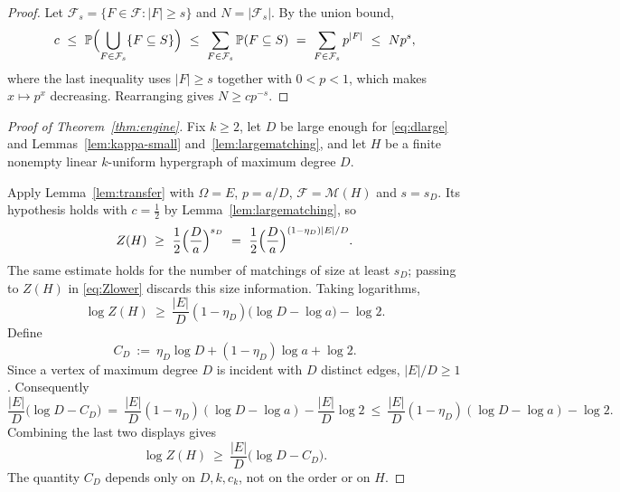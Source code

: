 \documentclass[10pt,a4paper]{amsart}
\newcommand{\EE}{E}
\newcommand{\Mat}{\mathcal{M}}
\newcommand{\PP}{\mathbb{P}}
\begin{document}
\begin{proof}
Let $\mathcal{F}_s=\{F\in\mathcal{F}:|F|\ge s\}$ and $N=|\mathcal{F}_s|$. By the union
bound,
\[
  c\ \le\ \PP\Bigl(\bigcup_{F\in\mathcal{F}_s}\{F\subseteq S\}\Bigr)
  \ \le\ \sum_{F\in\mathcal{F}_s}\PP(F\subseteq S)
  \ =\ \sum_{F\in\mathcal{F}_s}p^{|F|}
  \ \le\ N p^{s},
\]
where the last inequality uses $|F|\ge s$ together with $0<p<1$, which makes
$x\mapsto p^{x}$ decreasing. Rearranging gives $N\ge cp^{-s}$.
\end{proof}

\begin{proof}[Proof of Theorem~\ref{thm:engine}]
Fix $k\ge2$, let $D$ be large enough for \eqref{eq:dlarge} and
Lemmas~\ref{lem:kappa-small} and~\ref{lem:largematching}, and let $H$ be a finite
nonempty linear $k$-uniform hypergraph of maximum degree $D$.

Apply Lemma~\ref{lem:transfer} with $\Omega=\EE$, $p=a/D$, $\mathcal{F}=\Mat(H)$ and
$s=s_D$. Its hypothesis holds with $c=\tfrac12$ by Lemma~\ref{lem:largematching}, so
\begin{equation}
\label{eq:Zlower}
  Z(H)\ \ge\ \frac12\Bigl(\frac{D}{a}\Bigr)^{s_D}
  \ =\ \frac12\Bigl(\frac{D}{a}\Bigr)^{(1-\eta_D)|\EE|/D}.
\end{equation}
The same estimate holds for the number of matchings of size at least $s_D$;
passing to $Z(H)$ in \eqref{eq:Zlower} discards this size information.
Taking logarithms,
\[
  \log Z(H)\ \ge\ \frac{|\EE|}{D}(1-\eta_D)\bigl(\log D-\log a\bigr)-\log 2 .
\]
Define
\begin{equation}
\label{eq:Cd}
  C_D\ :=\ \eta_D\log D+(1-\eta_D)\log a+\log 2 .
\end{equation}
Since a vertex of maximum degree $D$ is incident with $D$ distinct edges,
$|\EE|/D\ge1$. Consequently
\[
  \frac{|\EE|}{D}\bigl(\log D-C_D\bigr)
  \ =\ \frac{|\EE|}{D}(1-\eta_D)(\log D-\log a)
       -\frac{|\EE|}{D}\log2
  \ \le\ \frac{|\EE|}{D}(1-\eta_D)(\log D-\log a)-\log 2.
\]
Combining the last two displays gives
\begin{equation}
\label{eq:engine}
  \log Z(H)\ \ge\ \frac{|\EE|}{D}\bigl(\log D-C_D\bigr).
\end{equation}
The quantity $C_D$ depends only on $D,k,c_k$, not on the order or on $H$.


\end{proof}
\end{document}
